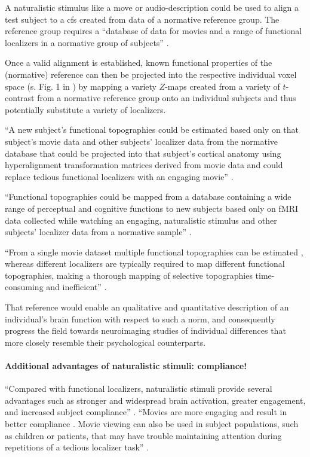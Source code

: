 %
A naturalistic stimulus like a move or audio-description could be used to align
a test subject to a \ac{cfs} created from data of a normative reference group.
%
The reference group requires a ``database of data for movies and a range of
functional localizers in a normative group of subjects''
\citep{jiahui2020predicting}.

%
Once a valid alignment is established, known functional properties of the
(normative) reference can then be projected into the respective individual voxel
space (s. Fig. 1 in \citep{nishimoto2016lining}) by mapping a variety $Z$-maps
created from a variety of $t$-contrast from a normative reference group onto an
individual subjects and thus potentially substitute a variety of localizers.

%
``A new subject's functional topographies could be estimated based only on that
subject's movie data and other subjects' localizer data from the normative
database that could be projected into that subject's cortical anatomy using
hyperalignment transformation matrices derived from movie data and could replace
tedious functional localizers with an engaging movie''
\citep{jiahui2020predicting}.

%
``Functional topographies could be mapped from a database containing a wide
range of perceptual and cognitive functions to new subjects based only on fMRI
data collected while watching an engaging, naturalistic stimulus and other
subjects' localizer data from a normative sample'' \citep{jiahui2020predicting}.

``From a single movie dataset multiple functional topographies can be estimated
\citep{guntupalli2016model}, whereas different localizers are typically required
to map different functional topographies, making a thorough mapping of selective
topographies time-consuming and inefficient'' \citep{jiahui2020predicting}.

%
That reference would enable an qualitative and quantitative description of an
individual's brain function with respect to such a norm, and consequently
progress the field towards neuroimaging studies of individual differences that
more closely resemble their psychological counterparts.


\paragraph{Additional advantages of naturalistic stimuli: compliance!}
%
``Compared with functional localizers, naturalistic stimuli provide several
advantages such as stronger and widespread brain activation, greater engagement,
and increased subject compliance'' \citep{jiahui2020predicting}.
%
``Movies are more engaging and result in better compliance
\citep{vanderwal2015inscapes}.
%
Movie viewing can also be used in subject populations, such as children
\citep{richardson2018development} or patients, that may have trouble maintaining
attention during repetitions of a tedious localizer task''
\citep{jiahui2020predicting}.

